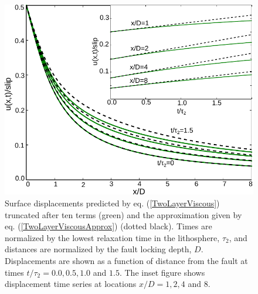 \begin{figure}\label{figure1}
  \centering 
  \includegraphics{ch2/figures/Fig1.pdf}
  \caption{Surface displacements predicted by
    eq. (\ref{TwoLayerViscous}) truncated after ten terms (green) and
    the approximation given by eq. (\ref{TwoLayerViscousApprox})
    (dotted black).  Times are normalized by the lowest relaxation
    time in the lithosphere, $\tau_2$, and distances are normalized by
    the fault locking depth, $D$.  Displacements are shown as a
    function of distance from the fault at times $t/\tau_2 =
    0.0,0.5,1.0$ and $1.5$. The inset figure shows displacement time
    series at locations $x/D = 1, 2, 4$ and $8$.}
  \label{Figure 1}
\end{figure} 

